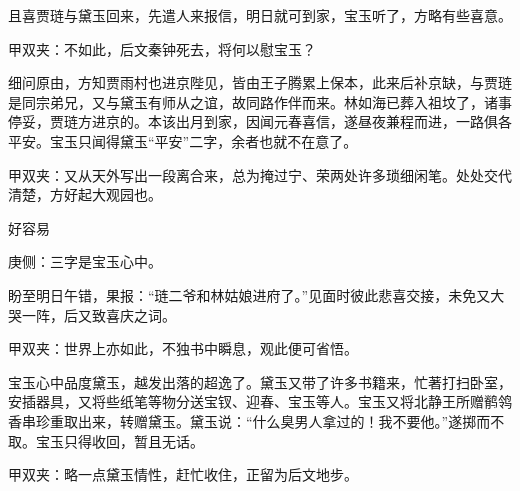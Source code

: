 \begin{parag}
    且喜贾琏与黛玉回来，先遣人来报信，明日就可到家，宝玉听了，方略有些喜意。\begin{note}甲双夹：不如此，后文秦钟死去，将何以慰宝玉？\end{note}细问原由，方知贾雨村也进京陛见，皆由王子腾累上保本，此来后补京缺，与贾琏是同宗弟兄，又与黛玉有师从之谊，故同路作伴而来。林如海已葬入祖坟了，诸事停妥，贾琏方进京的。本该出月到家，因闻元春喜信，遂昼夜兼程而进，一路俱各平安。宝玉只闻得黛玉“平安”二字，余者也就不在意了。\begin{note}甲双夹：又从天外写出一段离合来，总为掩过宁、荣两处许多琐细闲笔。处处交代清楚，方好起大观园也。\end{note}
\end{parag}


\begin{parag}
    好容易\begin{note}庚侧：三字是宝玉心中。\end{note}盼至明日午错，果报：“琏二爷和林姑娘进府了。”见面时彼此悲喜交接，未免又大哭一阵，后又致喜庆之词。\begin{note}甲双夹：世界上亦如此，不独书中瞬息，观此便可省悟。\end{note}宝玉心中品度黛玉，越发出落的超逸了。黛玉又带了许多书籍来，忙著打扫卧室，安插器具，又将些纸笔等物分送宝钗、迎春、宝玉等人。宝玉又将北静王所赠鹡鸰香串珍重取出来，转赠黛玉。黛玉说：“什么臭男人拿过的！我不要他。”遂掷而不取。宝玉只得收回，暂且无话。\begin{note}甲双夹：略一点黛玉情性，赶忙收住，正留为后文地步。\end{note}
\end{parag}


